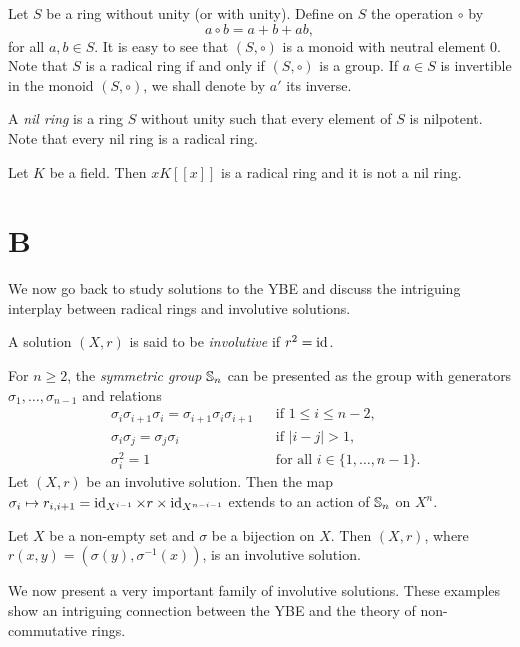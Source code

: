 Let $S$ be a ring without unity (or with unity).
Define on $S$ the operation $\circ$ by
$$a\circ b=a+b+ab,$$
for all $a,b\in S$. It is easy to see that $(S,\circ)$ is a monoid with neutral element $0$.
Note that $S$ is a radical ring if and only if $(S,\circ)$ is a group. If $a\in S$ is invertible in the monoid $(S,\circ)$, we shall denote by $a'$ its inverse.

A {\em nil ring} is a ring $S$ without unity such that every element of $S$ is nilpotent. Note that every nil ring is a radical ring.

\begin{example} Let $K$ be a field. Then $xK[[x]]$ is a radical ring and it is not a nil ring.
	\end{example}

\section*{B}

We now go back to study solutions to the YBE and discuss the intriguing interplay
between radical rings and involutive solutions. 

\begin{definition}
	A solution $(X,r)$ is said to be \emph{involutive} if $r^2=\operatorname{id}$. 
\end{definition}

For $n\geq2$, the \emph{symmetric group} $\mathbb{S}_n$ can be presented 
as the group with generators $\sigma_1,\dots,\sigma_{n-1}$ and relations
\begin{align*}
	&\sigma_i\sigma_{i+1}\sigma_i=\sigma_{i+1}\sigma_i\sigma_{i+1} && \text{if }1\leq i\leq n-2,\\
	&\sigma_i\sigma_j=\sigma_j\sigma_i && \text{if }|i-j|> 1,\\
	&\sigma_i^2=1 && \text{for all $i\in\{1,\dots,n-1\}$}.
\end{align*}
Let $(X,r)$ be an involutive solution. 
Then the map $\sigma_i\mapsto r_{i,i+1}=\operatorname{id}_{X^{i-1}}\times r\times\operatorname{id}_{X^{n-i-1}}$ extends 
to an action of $\mathbb{S}_n$ on $X^n$.

\begin{example}
	Let $X$ be a non-empty set and $\sigma$ be a bijection on $X$. Then 
	$(X,r)$, where $r(x,y)=(\sigma(y),\sigma^{-1}(x))$, is an involutive solution. 
\end{example}

We now present a very important family of involutive solutions. 
These examples show an intriguing connection between the YBE and the 
theory of non-commutative rings. 


